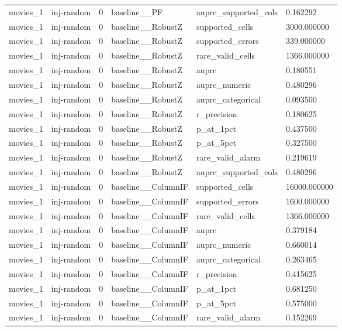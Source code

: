 \begin{tabular}{llllll}
movies\_1 & inj-random & 0 & baseline\_\_PF & auprc\_supported\_cols & 0.162292 \\
movies\_1 & inj-random & 0 & baseline\_\_RobustZ & supported\_cells & 3000.000000 \\
movies\_1 & inj-random & 0 & baseline\_\_RobustZ & supported\_errors & 339.000000 \\
movies\_1 & inj-random & 0 & baseline\_\_RobustZ & rare\_valid\_cells & 1366.000000 \\
movies\_1 & inj-random & 0 & baseline\_\_RobustZ & auprc & 0.180551 \\
movies\_1 & inj-random & 0 & baseline\_\_RobustZ & auprc\_numeric & 0.480296 \\
movies\_1 & inj-random & 0 & baseline\_\_RobustZ & auprc\_categorical & 0.093500 \\
movies\_1 & inj-random & 0 & baseline\_\_RobustZ & r\_precision & 0.180625 \\
movies\_1 & inj-random & 0 & baseline\_\_RobustZ & p\_at\_1pct & 0.437500 \\
movies\_1 & inj-random & 0 & baseline\_\_RobustZ & p\_at\_5pct & 0.327500 \\
movies\_1 & inj-random & 0 & baseline\_\_RobustZ & rare\_valid\_alarm & 0.219619 \\
movies\_1 & inj-random & 0 & baseline\_\_RobustZ & auprc\_supported\_cols & 0.480296 \\
movies\_1 & inj-random & 0 & baseline\_\_ColumnIF & supported\_cells & 16000.000000 \\
movies\_1 & inj-random & 0 & baseline\_\_ColumnIF & supported\_errors & 1600.000000 \\
movies\_1 & inj-random & 0 & baseline\_\_ColumnIF & rare\_valid\_cells & 1366.000000 \\
movies\_1 & inj-random & 0 & baseline\_\_ColumnIF & auprc & 0.379184 \\
movies\_1 & inj-random & 0 & baseline\_\_ColumnIF & auprc\_numeric & 0.660014 \\
movies\_1 & inj-random & 0 & baseline\_\_ColumnIF & auprc\_categorical & 0.263465 \\
movies\_1 & inj-random & 0 & baseline\_\_ColumnIF & r\_precision & 0.415625 \\
movies\_1 & inj-random & 0 & baseline\_\_ColumnIF & p\_at\_1pct & 0.681250 \\
movies\_1 & inj-random & 0 & baseline\_\_ColumnIF & p\_at\_5pct & 0.575000 \\
movies\_1 & inj-random & 0 & baseline\_\_ColumnIF & rare\_valid\_alarm & 0.152269 \\

\end{tabular}
